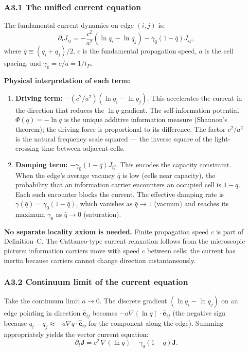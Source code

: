 \documentclass[reprint]{revtex4-2}
\begin{document}
\subsubsection{A3.1 The unified current equation}

The fundamental current dynamics on edge $(i,j)$ is:
\begin{equation}
\partial_t J_{ij} = -\frac{c^2}{a^2}(\ln q_i - \ln q_j) - \gamma_0(1-\bar{q})J_{ij},
\label{eq:a3_current}
\end{equation}
where $\bar{q} \equiv (q_i+q_j)/2$, $c$ is the fundamental propagation speed, $a$ is the cell spacing, and $\gamma_0 = c/a = 1/t_P$.

\textbf{Physical interpretation of each term:}
\begin{enumerate}[label=(\roman*)]
\item \textbf{Driving term:} $-(c^2/a^2)(\ln q_i - \ln q_j)$. This accelerates the current in the direction that reduces the $\ln q$ gradient. The self-information potential $\Phi(q)=-\ln q$ is the unique additive information measure (Shannon's theorem); the driving force is proportional to its difference. The factor $c^2/a^2$ is the natural frequency scale squared --- the inverse square of the light-crossing time between adjacent cells.
\item \textbf{Damping term:} $-\gamma_0(1-\bar{q})J_{ij}$. This encodes the capacity constraint. When the edge's average vacancy $\bar{q}$ is low (cells near capacity), the probability that an information carrier encounters an occupied cell is $1-\bar{q}$. Each such encounter blocks the current. The effective damping rate is $\gamma(\bar{q}) = \gamma_0(1-\bar{q})$, which vanishes as $\bar{q}\to 1$ (vacuum) and reaches its maximum $\gamma_0$ as $\bar{q}\to 0$ (saturation).
\end{enumerate}

\textbf{No separate locality axiom is needed.} Finite propagation speed $c$ is part of Definition~C. The Cattaneo-type current relaxation follows from the microscopic picture: information carriers move with speed $c$ between cells; the current has inertia because carriers cannot change direction instantaneously.

\subsubsection{A3.2 Continuum limit of the current equation}

Take the continuum limit $a\to 0$. The discrete gradient $(\ln q_i - \ln q_j)$ on an edge pointing in direction $\hat{\mathbf{e}}_{ij}$ becomes $-a\nabla(\ln q)\cdot\hat{\mathbf{e}}_{ij}$ (the negative sign because $q_i - q_j \approx -a\nabla q\cdot\hat{\mathbf{e}}_{ij}$ for the component along the edge). Summing appropriately yields the vector current equation:
\begin{equation}
\partial_t \mathbf{J} = c^2\,\nabla(\ln q) - \gamma_0(1-q)\mathbf{J}.
\label{eq:a3_continuum_current}
\end{equation}
\end{document}
